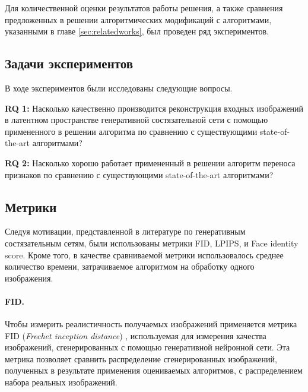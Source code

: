 
Для количественной оценки результатов работы решения, а также сравнения предложенных в решении алгоритмических модификаций с алгоритмами, указанными в главе \ref{sec:relatedworks}, был проведен ряд экспериментов.


\subsection{Задачи экспериментов}
В ходе экспериментов были исследованы следующие вопросы.

\textbf{RQ 1: } Насколько качественно производится реконструкция входных изображений в латентном пространстве генеративной состязательной сети с помощью примененного в решении алгоритма по сравнению с существующими state-of-the-art алгоритмами?

\textbf{RQ 2: }Насколько хорошо работает примененный в решении алгоритм переноса признаков по сравнению с существующими state-of-the-art алгоритмами?



\subsection{Метрики}
Следуя мотивации, представленной в литературе по генеративным состязательным сетям, были использованы метрики FID, LPIPS, и Face identity score. Кроме того, в качестве сравниваемой метрики использовалось среднее количество времени, затрачиваемое алгоритмом на обработку одного изображения.

\paragraph{FID.} 
Чтобы измерить реалистичность получаемых изображений применяется метрика FID (\emph{Frechet inception distance}) \cite{heusel2017fid}, используемая для измерения качества изображений, сгенерированных с помощью генеративной нейронной сети.
Эта метрика позволяет сравнить распределение сгенерированных изображений, полученных в результате применения оцениваемых алгоритмов, с распределением набора реальных изображений.

